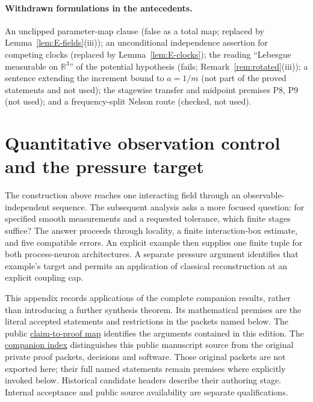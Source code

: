 \documentclass[11pt]{article}
\theoremstyle{plain}
\theoremstyle{definition}
\theoremstyle{remark}
\newcommand{\R}{\mathbb{R}}
\begin{document}
\paragraph{Withdrawn formulations in the antecedents.} An unclipped
parameter-map clause (false as a total map; replaced by Lemma~\ref{lem:E-fields}(iii));
an unconditional independence assertion for competing clocks (replaced by
Lemma~\ref{lem:E-clocks}); the reading ``Lebesgue measurable on $\R^{3}$'' of the
potential hypothesis (fails; Remark~\ref{rem:rotated}(iii)); a sentence extending
the increment bound to $a=1/m$ (not part of the proved statements and not used);
the stagewise transfer and midpoint premises P8, P9 (not used); and a
frequency-split Nelson route (checked, not used).

\begingroup
\small
\clearpage
\section{Quantitative observation control and the pressure target}
\label{qrs:supplement}

The construction above reaches one interacting field through an
observable-independent sequence. The subsequent analysis asks a more focused
question: for specified smooth measurements and a requested tolerance, which
finite stages suffice? The answer proceeds through locality, a finite
interaction-box estimate, and five compatible errors. An explicit example then
supplies one finite tuple for both process-neuron architectures. A separate
pressure argument identifies that example's target and permits an application
of classical reconstruction at an explicit coupling cap.

This appendix records applications of the complete companion results, rather
than introducing a further synthesis theorem. Its mathematical premises are
the literal accepted statements and restrictions in the packets named below.
The public \href{run:PROOF-MAP.md}{claim-to-proof map} identifies the arguments
contained in this edition. The \href{run:COMPANION-INDEX.md}{companion index}
distinguishes this public manuscript source from the original private proof
packets, decisions and software. Those original packets are not exported here;
their full named statements remain premises where explicitly invoked below.
Historical candidate headers describe their authoring stage. Internal
acceptance and public source availability are separate qualifications.
\end{document}
